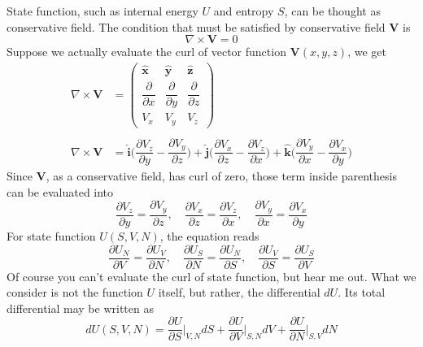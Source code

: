 \documentclass[../../../Main.tex]{subfiles}
\begin{document}
State function, such as internal energy \(U \) and entropy \(S \), can be thought as conservative field. The condition that must be satisfied by conservative field $\mathbf{V}$ is
\begin{equation*}
    \nabla\times \mathbf{V}=0
\end{equation*}
Suppose we actually evaluate the curl of vector function $\mathbf{V}(x,y,z)$, we get
\begin{align*}
    \nabla\times \mathbf{V}&=\begin{pmatrix}
        \mathbf{\hat{x}} & \mathbf{\hat{y}} & \mathbf{\hat{z}}\\
        \dfrac{\partial }{\partial x} & \dfrac{\partial }{\partial y} & \dfrac{\partial }{\partial z}\\
        V_x& V_y & V_z
    \end{pmatrix}\\
    \\
    \nabla\times \mathbf{V}&=
    \mathbf{\hat{i}} \biggl(\dfrac{\partial V_z}{\partial y} -\dfrac{\partial V_y}{\partial z}\biggr)+ 
    \mathbf{\hat{j}} \biggl(\dfrac{\partial V_x}{\partial z}-\dfrac{\partial V_z}{\partial x} \biggr) + 
    \mathbf{\hat{k}}\biggl( \dfrac{\partial V_y}{\partial x}-\dfrac{\partial V_x}{\partial y}\biggr)
\end{align*} 
Since \textbf{V}, as a conservative field, has curl of zero, those term inside parenthesis can be evaluated into
\begin{equation*}
    \dfrac{\partial V_z}{\partial y} =\dfrac{\partial V_y}{\partial z},\quad
    \dfrac{\partial V_x}{\partial z}=\dfrac{\partial V_z}{\partial x},\quad
    \dfrac{\partial V_y}{\partial x}=\dfrac{\partial V_x}{\partial y}
\end{equation*}
For state function \(U(S,V,N)\), the equation reads
\begin{equation*}
    \dfrac{\partial U_N}{\partial V} =\dfrac{\partial U_V}{\partial N},\quad
    \dfrac{\partial U_S}{\partial N}=\dfrac{\partial U_N}{\partial S},\quad
    \dfrac{\partial U_V}{\partial S}=\dfrac{\partial U_S}{\partial V}
\end{equation*}
Of course you can't evaluate the curl of state function, but hear me out. What we consider is not the function $U$ itself, but rather, the differential $dU$. Its total differential may be written as 
\begin{equation*}
    dU(S,V,N)=\frac{\partial U}{\partial S}\bigg|_{V,N} dS + \frac{ \partial U}{\partial V}\bigg|_{S,N} dV+ \frac{\partial U}{\partial N}\bigg|_{S,V}dN
\end{equation*}
\end{document}
